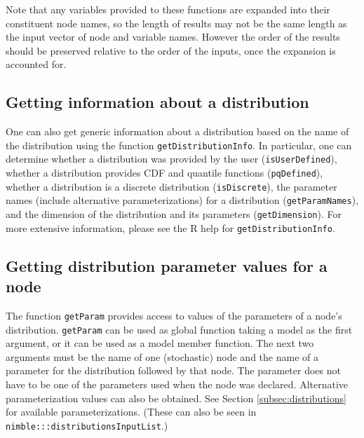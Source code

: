\documentclass[12pt,oneside]{book}\usepackage[]{graphicx}\usepackage[]{color}
\def\cd#1{\texttt{#1}}
\begin{document}
Note that any variables provided to these functions are expanded into
their constituent node names, so the length of results may not be the
same length as the input vector of node and variable names. However
the order of the results should be preserved relative to the order of
the inputs, once the expansion is accounted for. 

\subsection{Getting information about a distribution}

One can also get generic information about a distribution based on the
name of the distribution using the function \cd{getDistributionInfo}. 
In particular, one can determine whether a distribution
was provided by the user (\cd{isUserDefined}), whether a distribution provides CDF and
quantile functions (\cd{pqDefined}), whether a distribution is a
discrete distribution (\cd{isDiscrete}), the parameter names (include
alternative parameterizations) for a distribution (\cd{getParamNames}),
and the dimension of the distribution and its parameters
(\cd{getDimension}).  For more extensive information, please see the R
help for \cd{getDistributionInfo}.

\subsection{Getting distribution parameter values for a node}
\label{sec:getParam}

The function \cd{getParam} provides access to values of the parameters
of a node's distribution.  \cd{getParam} can be
used as  global function taking a model as the first argument, or it
can be used as a model member function.  The next two arguments must
be the name of one (stochastic) node and the name of a parameter for the
distribution followed by that node.  The parameter does not have to be
one of the parameters used when the node was declared.  Alternative
parameterization values can also be obtained. See
 Section \ref{subsec:distributions} for available parameterizations.
(These can also be seen in \cd{nimble:::distributionsInputList}.) 
\end{document}
